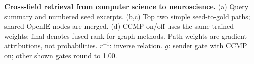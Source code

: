 \textbf{Cross-field retrieval from computer science to neuroscience.}
(a) Query summary and numbered seed excerpts.
(b,c) Top two simple seed-to-gold paths; shared OpenIE nodes are merged.
(d) CCMP on/off uses the same trained weights; final denotes fused rank for graph methods.
Path weights are gradient attributions, not probabilities.
$r^{-1}$: inverse relation. $g$: sender gate with CCMP on; other shown gates round to 1.00.
